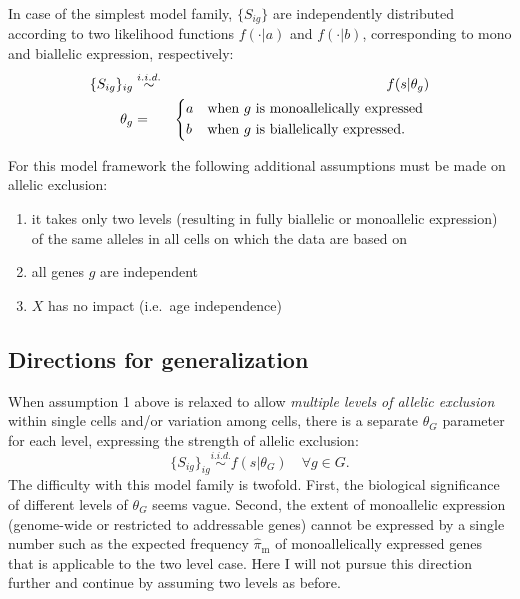 \documentclass[letterpaper]{article}
\begin{document}
In case of the simplest model family, $\{S_{ig}\}$ are independently
distributed according to two likelihood functions $f(\cdot|a)$ and
$f(\cdot|b)$, corresponding to mono and biallelic expression, respectively:
\begin{eqnarray}
\label{eq:two-level}
\{S_{ig}\}_{ig} &\overset{i.i.d.}{\sim}& f(s | \theta_g) \\
\label{eq:two-level-cases}
\theta_g &=&
\begin{dcases*}
a & when $g$ is monoallelically expressed \\
b & when $g$ is biallelically expressed.
\end{dcases*}
\end{eqnarray}

For this model framework the following additional assumptions must be made on
allelic exclusion:
\begin{enumerate}
\item it takes only two levels (resulting in fully biallelic or monoallelic
expression) of the same alleles in all cells on which the data are based on
\item all genes $g$ are independent
\item $X$ has no impact (i.e.~age independence)
\end{enumerate}

\subsection{Directions for generalization}
\label{sec:generalizations}

When assumption 1 above is relaxed to allow \emph{multiple levels of allelic exclusion}
within single cells and/or variation among cells, there is a separate
$\theta_G$ parameter for each level, expressing the strength of allelic
exclusion:
\begin{equation*}
\{S_{ig}\}_{ig} \overset{i.i.d.}{\sim} f(s | \theta_G) \quad \forall g \in G.
\end{equation*}
The difficulty with this model family is twofold.  First, the biological
significance of different levels of $\theta_G$ seems vague.  Second, the
extent of monoallelic expression (genome-wide or restricted to addressable
genes) cannot be expressed by a single number such as the expected
frequency $\hat{\pi}_\mathrm{m}$ of monoallelically expressed genes that is applicable
to the two level case.  Here I will not pursue this direction further and
continue by assuming two levels as before.
\end{document}
